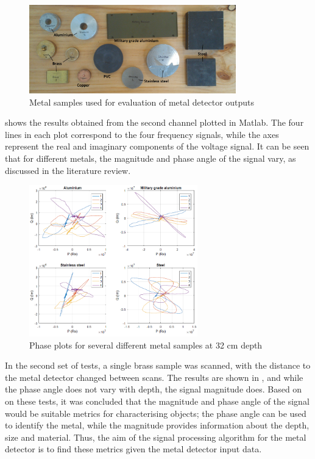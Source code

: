 \documentclass[main.tex]{subfiles}
\begin{document}
\begin{figure}[ht]
\includegraphics[width=0.8\textwidth]{3-ConceptDesign/samples.jpg}
\centering
\caption{Metal samples used for evaluation of metal detector outputs} 
\end{figure}

 shows the results obtained from the second channel plotted in Matlab. The four lines in each plot correspond to the four frequency signals, while the axes represent the real and imaginary components of the voltage signal. It can be seen that for different metals, the magnitude and phase angle of the signal vary, as discussed in the literature review. 

\begin{figure}[ht]
\includegraphics[width=0.65\textwidth]{3-ConceptDesign/metals.PNG}
\centering
\caption{Phase plots for several different metal samples at 32 cm depth} 
\end{figure}

In the second set of tests, a single brass sample was scanned, with the distance to the metal detector changed between scans. The results are shown in , and while the phase angle does not vary with depth, the signal magnitude does. Based on on these tests, it was concluded that the magnitude and phase angle of the signal would be suitable metrics for characterising objects; the phase angle can be used to identify the metal, while the magnitude provides information about the depth, size and material. Thus, the aim of the signal processing algorithm for the metal detector is to find these metrics given the metal detector input data. 
\end{document}
